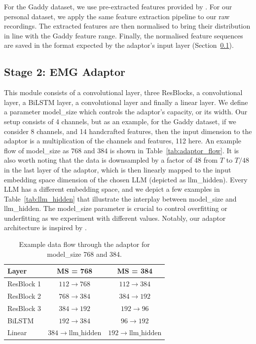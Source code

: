 For the Gaddy dataset, we use pre-extracted features provided by \citet{mohapatra2025}. For our personal dataset, we apply the same feature extraction pipeline to our raw recordings. The extracted features are then normalised to bring their distribution in line with the Gaddy feature range. Finally, the normalised feature sequences are saved in the format expected by the adaptor's input layer (Section~\ref{sec:adaptor}).

\subsection{Stage 2: EMG Adaptor}
\label{sec:adaptor}

This module consists of a convolutional layer, three ResBlocks, a convolutional layer, a BiLSTM layer, a convolutional layer and finally a linear layer. We define a parameter model\_size which controls the adaptor's capacity, or its width. Our setup consists of 4 channels, but as an example, for the Gaddy dataset, if we consider 8 channels, and 14 handcrafted features, then the input dimension to the adaptor is a multiplication of the channels and features, 112 here. An example flow of model\_size as 768 and 384 is shown in Table~\ref{tab:adaptor_flow}. It is also worth noting that the data is downsampled by a factor of 48 from $T$ to $T/48$ in the last layer of the adaptor, which is then linearly mapped to the input embedding space dimension of the chosen LLM (depicted as llm\_hidden). Every LLM has a different embedding space, and we depict a few examples in Table~\ref{tab:llm_hidden} that illustrate the interplay between model\_size and llm\_hidden. The model\_size parameter is crucial to control overfitting or underfitting as we experiment with different values. Notably, our adaptor architecture is inspired by \citet{mohapatra2025}.

\begin{table}[ht]
\centering
\caption{Example data flow through the adaptor for model\_size 768 and 384.}
\label{tab:adaptor_flow}
\label{tab:adaptor_flow_384}
\begin{tabular}{lcc}
\toprule
\textbf{Layer} & \textbf{MS = 768} & \textbf{MS = 384} \\
\midrule
ResBlock 1 & $112 \to 768$ & $112 \to 384$ \\
ResBlock 2 & $768 \to 384$ & $384 \to 192$ \\
ResBlock 3 & $384 \to 192$ & $192 \to 96$ \\
BiLSTM     & $192 \to 384$ & $96 \to 192$ \\
Linear     & $384 \to \text{llm\_hidden}$ & $192 \to \text{llm\_hidden}$ \\
\bottomrule
\end{tabular}
\end{table}

